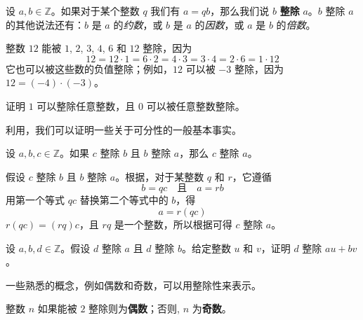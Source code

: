 \begin{definition}
\label{defDivisionPreliminary}
设 $a,b \in \mathbb{Z}$。如果对于某个整数 $q$ 我们有 $a=qb$，那么我们说 $b$ \textbf{整除} $a$。$b$ 整除 $a$ 的其他说法还有：$b$ 是 $a$ 的\textit{约数}，或 $b$ 是 $a$ 的\textit{因数}，或 $a$ 是 $b$ 的\textit{倍数}。
\end{definition}

\begin{example}
整数 $12$ 能被 $1$, $2$, $3$, $4$, $6$ 和 $12$ 整除，因为
\[ 12 = 12 \cdot 1 = 6 \cdot 2 = 4 \cdot 3 = 3 \cdot 4 = 2 \cdot 6 = 1 \cdot 12 \]
它也可以被这些数的负值整除；例如，$12$ 可以被 $-3$ 整除，因为 $12 = (-4) \cdot (-3)$。
\end{example}

\begin{exercise}
证明 $1$ 可以整除任意整数，且 $0$ 可以被任意整数整除。
\end{exercise}

利用，我们可以证明一些关于可分性的一般基本事实。

\begin{proposition}
\label{propDivisibilityIsTransitive}
设 $a,b,c \in \mathbb{Z}$。如果 $c$ 整除 $b$ 且 $b$ 整除 $a$，那么 $c$ 整除 $a$。
\end{proposition}

\begin{cproof}
假设 $c$ 整除 $b$ 且 $b$ 整除 $a$。根据，对于某整数 $q$ 和 $r$，它遵循
\[ b=qc \quad \text{且} \quad a=rb \]
用第一个等式 $qc$ 替换第二个等式中的 $b$，得
\[ a=r(qc) \]
$r(qc) = (rq)c$，且 $rq$ 是一个整数，所以根据可得 $c$ 整除 $a$。
\end{cproof}


\begin{exercise}
\label{exDivisibilityIsLinear}
设 $a,b,d \in \mathbb{Z}$。假设 $d$ 整除 $a$ 且 $d$ 整除 $b$。给定整数 $u$ 和 $v$，证明 $d$ 整除 $au+bv$。
\end{exercise}

一些熟悉的概念，例如偶数和奇数，可以用整除性来表示。

\begin{definition}
\label{defEvenOdd}
整数 $n$ 如果能被 $2$ 整除则为\textbf{偶数}；否则, $n$ 为\textbf{奇数}。
\end{definition}

